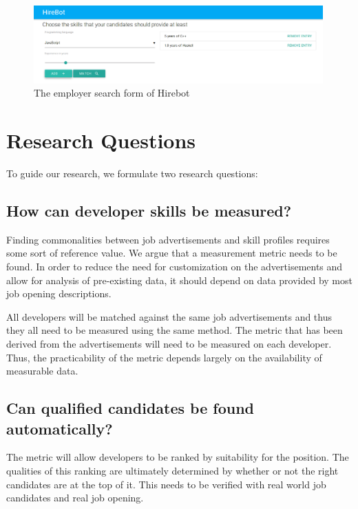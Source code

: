 \begin{figure}
  \includegraphics[width=30em]{gfx/employerview.png}
  \caption{The employer search form of Hirebot}
  \label{fig:employerview}
\end{figure}

\section{Research Questions}\label{sec:research-questions}
To guide our research, we formulate two research questions:

\subsection{How can developer skills be measured?}\label{subsec:dev-skill-measurement}
Finding commonalities between job advertisements and skill profiles
requires some sort of reference value. We argue that a measurement
metric needs to be found.
In order to reduce the need for customization
on the advertisements and allow for  analysis of pre-existing data,
it should depend on data provided by most job opening descriptions.
\newline

All developers will be matched against the same job advertisements and thus they all need to be measured using the same method. The metric that has been derived from the advertisements will need to be measured on each developer. Thus, the practicability of the metric depends largely on the availability of measurable data.

\subsection{Can qualified candidates be found automatically?}\label{subsec:measurement-quality}
The metric will allow developers to be ranked by suitability for the position. The qualities of this ranking are ultimately determined by whether or not the right candidates are at the top of it. This needs to be verified with real world job candidates and real job opening.

